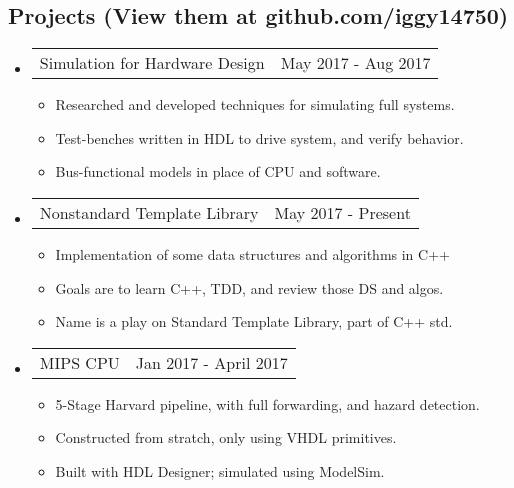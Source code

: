 \documentclass[18pt]{article}
\makeatletter
\providecommand{\tightlist}{
    \setlength{\itemsep}{0pt}\setlength{\parskip}{0pt}
}
\providecommand{\datetable}[2]{
    \begin{tabular*}{\textwidth}{r @{\extracolsep{\fill}} l}
        #1 & #2
    \end{tabular*}
}
\makeatother
\begin{document}
  \subsection*{Projects (View them at github.com/iggy14750)}\label{projects}
    \begin{itemize}\tightlist
        
      \item \datetable{Simulation for Hardware Design}{May 2017 - Aug 2017}
      \begin{itemize}\tightlist
        \item Researched and developed techniques for simulating full systems.
        \item Test-benches written in HDL to drive system, and verify behavior.
        \item Bus-functional models in place of CPU and software.
      \end{itemize}
        
      \item \datetable{Nonstandard Template Library}{May 2017 - Present}
      \begin{itemize}\tightlist
        \item Implementation of some data structures and algorithms in C++
        \item Goals are to learn C++, TDD, and review those DS and algos.
        \item Name is a play on Standard Template Library, part of C++ std.
      \end{itemize}
          
      \item \datetable{MIPS CPU}{Jan 2017 - April 2017}
      \begin{itemize}\tightlist
        \item 5-Stage Harvard pipeline, with full forwarding, and hazard detection.
        \item Constructed from stratch, only using VHDL primitives.
        \item Built with HDL Designer; simulated using ModelSim.
      \end{itemize}
      
      

\end{itemize}
\end{document}
